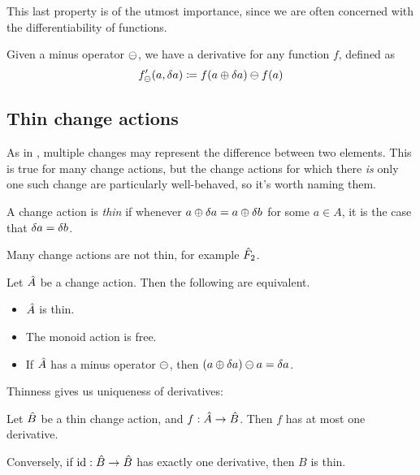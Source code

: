This last property is of the utmost importance, since we are often concerned with the differentiability
of functions.

\begin{defn}
  Given a minus operator $\ominus$, we have a derivative for any function $f$,
  defined as
  $$f'_\ominus(a, \delta a) \coloneqq f(a \oplus \delta a) \ominus f(a)$$
\end{defn}

\subsection{Thin change actions}
\label{sec:thin}

As in \textcite{cai2014changes}, multiple changes may represent the difference
between two elements. This is true for many change actions, but the change
actions for which there \emph{is} only one such change are particularly
well-behaved, so it's worth naming them.

\begin{defn}
  A change action is \textit{thin} if whenever $a \oplus \delta a
  = a \oplus \delta b$ for some $a \in A$, it is the case that $\delta a = \delta b$.
\end{defn}

Many change actions are not thin, for example $\hat{F}_2$.

\begin{prop}
  Let $\hat{A}$ be a change action. Then the following are equivalent.
  \begin{itemize}
    \item $\hat{A}$ is thin.
    \item The monoid action is free.
    \item If $\hat{A}$ has a minus operator $\ominus$, then $(a \oplus \delta a)
      \ominus a = \delta a$.
  \end{itemize}
\end{prop}

Thinness gives us uniqueness of derivatives:

\begin{prop}
  Let $\hat{B}$ be a thin change action, and $f: \hat{A} \rightarrow \hat{B}$. Then $f$ has at
  most one derivative.

  Conversely, if $\textrm{id}: \hat{B} \rightarrow \hat{B}$ has exactly one derivative, then
  $B$ is thin.
\end{prop}

